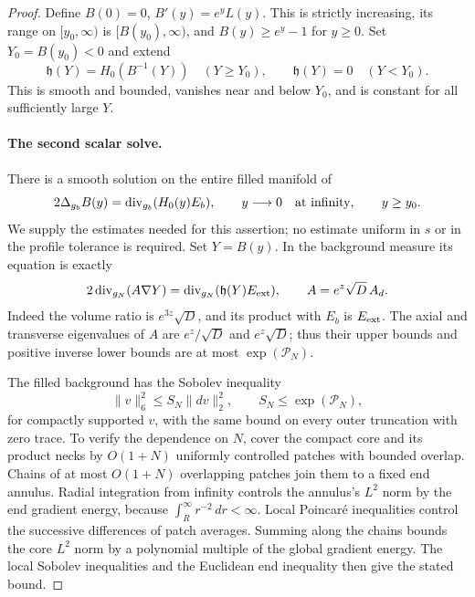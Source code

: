 \begin{proof}
Define $B(0)=0$, $B'(y)=e^yL(y)$.  This is strictly increasing,
its range on $[y_0,\infty)$ is $[B(y_0),\infty)$, and
$B(y)\ge e^y-1$ for $y\ge0$.  Set $Y_0=B(y_0)<0$ and extend
\[
 \mathfrak h(Y)=H_0(B^{-1}(Y))\quad(Y\ge Y_0),\qquad
 \mathfrak h(Y)=0\quad(Y<Y_0).
\]
This is smooth and bounded, vanishes near and below $Y_0$, and is
constant for all sufficiently large $Y$.

\paragraph{The second scalar solve.}
There is a smooth solution on the entire filled manifold of
\begin{equation}\label{cp:bounded-flux-equation}
 2\Delta_{g_b}B(y)=\operatorname{div}_{g_b}(H_0(y)E_b),
 \qquad y\longrightarrow0\quad\hbox{at infinity},
 \qquad y\ge y_0.
\end{equation}
We supply the estimates needed for this assertion; no estimate
uniform in $s$ or in the profile tolerance is required.
Set $Y=B(y)$.  In the background measure its equation is exactly
\begin{equation}\label{cp:background-flux-equation}
 2\operatorname{div}_{g_N}(A\nabla Y)
   =\operatorname{div}_{g_N}(\mathfrak h(Y)E_{\rm ext}),
 \qquad A=e^z\sqrt D\,A_d.
\end{equation}
Indeed the volume ratio is $e^{3z}\sqrt D$, and its product with
$E_b$ is $E_{\rm ext}$.  The axial and transverse eigenvalues of
$A$ are $e^z/\sqrt D$ and $e^z\sqrt D$; thus their upper bounds
and positive inverse lower bounds are at most $\exp(\mathcal P_N)$.

The filled background has the Sobolev inequality
\[
 \|v\|_6^2\le S_N\|dv\|_2^2,
 \qquad S_N\le\exp(\mathcal P_N),
\]
for compactly supported $v$, with the same bound on every outer
truncation with zero trace.  To verify the dependence on $N$, cover
the compact core and its product necks by $O(1+N)$ uniformly
controlled patches with bounded overlap.  Chains of at most
$O(1+N)$ overlapping patches join them to a fixed end annulus.
Radial integration from infinity controls the annulus's $L^2$
norm by the end gradient energy, because
$\int_R^\infty r^{-2}\,dr<\infty$.  Local Poincar\'e inequalities
control the successive differences of patch averages.  Summing
along the chains bounds the core $L^2$ norm by a polynomial
multiple of the global gradient energy.  The local Sobolev
inequalities and the Euclidean end inequality then give the
stated bound.


\end{proof}
